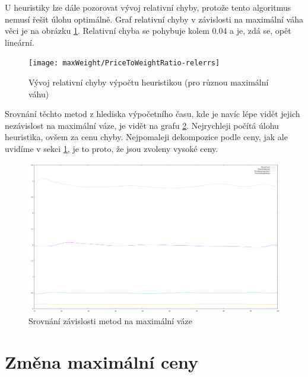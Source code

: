 \documentclass[12pt,a4paper]{article}
\begin{document}
U heuristiky lze dále pozorovat vývoj relativní chyby, protože tento algoritmus nemusí řešit úlohu optimálně. Graf relativní chyby v závislosti na maximální váha věci je na obrázku \ref{maxWeight/PriceToWeightRatio-relerrs}. Relativní chyba se pohybuje kolem 0.04 a je, zdá se, opět lineární.

\begin{figure}[H]
\begin{center}
\texttt{[image: maxWeight/PriceToWeightRatio-relerrs]}
\caption{Vývoj relativní chyby výpočtu heuristikou (pro různou maximální váhu)}
\label{maxWeight/PriceToWeightRatio-relerrs}
\end{center}
\end{figure}

Srovnání těchto metod z hlediska výpočetního času, kde je navíc lépe vidět jejich nezávislost na maximální váze, je vidět na grafu \ref{maxWeight/allExecTimes}. Nejrychleji počítá úlohu heuristika, ovšem za cenu chyby. Nejpomaleji dekompozice podle ceny, jak ale uvidíme v sekci \ref{maxCost}, je to proto, že jsou zvoleny vysoké ceny.

\begin{figure}[H]
\begin{center}
\includegraphics[width=\textwidth]{maxWeight/allExecTimes}
\caption{Srovnání závislosti metod na maximální váze}
\label{maxWeight/allExecTimes}
\end{center}
\end{figure}








\section{Změna maximální ceny}
\label{maxCost}
\end{document}
